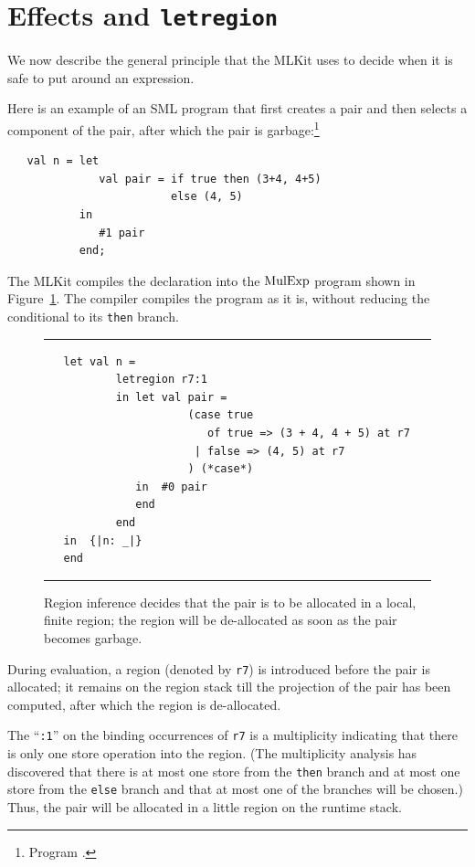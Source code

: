 \documentclass[12pt]{book}
\begin{document}
\section{Effects and \texttt{letregion}}
\label{effects.sec}
We now describe the general principle that the MLKit uses to decide when
it is safe to put 
%
 around an expression.

Here is an example of an SML program that first creates a pair and
then selects a component of the pair, after which the pair is
garbage:\footnote{Program .}
\begin{verbatim}
   val n = let 
              val pair = if true then (3+4, 4+5) 
                         else (4, 5)
           in 
              #1 pair
           end;
\end{verbatim}
The MLKit compiles the declaration into the $\hbox{\rm MulExp}$ program shown in
Figure~\ref{elimpair.fig}.  The compiler compiles the program as it
is, without reducing the conditional to its {\tt then} branch.
\begin{figure}
\hrule\medskip
\begin{verbatim}
   let val n = 
           letregion r7:1 
           in let val pair = 
                      (case true 
                         of true => (3 + 4, 4 + 5) at r7 
                       | false => (4, 5) at r7
                      ) (*case*) 
              in  #0 pair
              end  
           end
   in  {|n: _|}
   end 
\end{verbatim}
\caption{Region inference decides that the pair is to be allocated 
  in a local, finite region; the region will be de-allocated as soon
  as the pair becomes garbage.}  
\medskip\hrule
\label{elimpair.fig}
\end{figure}
During evaluation, a region (denoted by {\tt r7}) is introduced before
the pair is allocated; it remains on the region stack till the
projection of the pair has been computed, after which the region is
de-allocated.

The ``{\tt :1}'' on the binding occurrences of {\tt r7} is a
multiplicity indicating that there is only one store operation into
the region. (The
%
multiplicity analysis has discovered that there is at most one store
from the {\tt then} branch and at most one store from the {\tt else}
branch and that at most one of the branches will be chosen.) Thus, the
pair will be allocated in a little region on the runtime stack.
\end{document}
